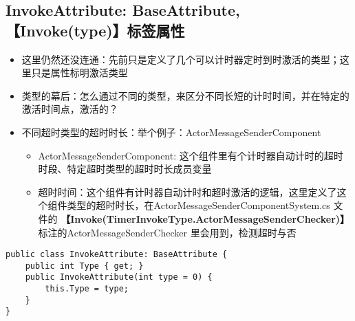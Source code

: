 \documentclass[9pt, b5paper]{article}
\begin{document}
\subsection{InvokeAttribute: BaseAttribute, 【Invoke(type)】标签属性}
\label{sec-1-21}
\begin{itemize}
\item 这里仍然还没连通：先前只是定义了几个可以计时器定时到时激活的类型；这里只是属性标明激活类型
\item 类型的幕后：怎么通过不同的类型，来区分不同长短的计时时间，并在特定的激活时间点，激活的？
\item 不同超时类型的超时时长：举个例子：ActorMessageSenderComponent
\begin{itemize}
\item ActorMessageSenderComponent: 这个组件里有个计时器自动计时的超时时段、特定超时类型的超时时长成员变量
\item 超时时间：这个组件有计时器自动计时和超时激活的逻辑，这里定义了这个组件类型的超时时长，在ActorMessageSenderComponentSystem.cs 文件的 \textbf{【Invoke(TimerInvokeType.ActorMessageSenderChecker)】} 标注的ActorMessageSenderChecker 里会用到，检测超时与否
\end{itemize}
\end{itemize}
\begin{verbatim}
public class InvokeAttribute: BaseAttribute {
    public int Type { get; }
    public InvokeAttribute(int type = 0) {
        this.Type = type;
    }
}
\end{verbatim}
\end{document}
